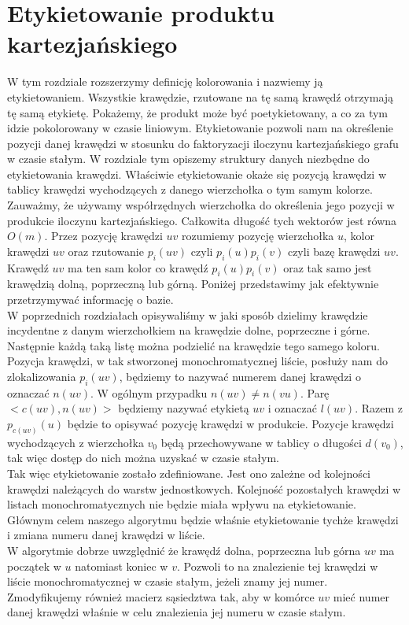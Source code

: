 \documentclass[12pt,a4paper,titlepage]{article}
\begin{document}
\section{Etykietowanie produktu kartezjańskiego}
W tym rozdziale rozszerzymy definicję kolorowania i nazwiemy ją etykietowaniem. Wszystkie krawędzie, rzutowane na tę samą krawędź otrzymają tę samą etykietę. Pokażemy, że produkt może być poetykietowany, a co za tym idzie pokolorowany w czasie liniowym. Etykietowanie pozwoli nam na określenie pozycji danej krawędzi w stosunku do faktoryzacji iloczynu kartezjańskiego grafu w czasie stałym. W rozdziale tym opiszemy struktury danych niezbędne do etykietowania krawędzi. Właściwie etykietowanie okaże się pozycją krawędzi w tablicy krawędzi wychodzących z danego wierzchołka o tym samym kolorze. \\
Zauważmy, że używamy współrzędnych wierzchołka do określenia jego pozycji w produkcie iloczynu kartezjańskiego. Całkowita długość tych wektorów jest równa $O(m)$. Przez pozycję krawędzi $uv$ rozumiemy pozycję wierzchołka $u$, kolor krawędzi $uv$ oraz rzutowanie $p_i (uv)$ czyli $p_i(u) p_i(v)$ czyli bazę krawędzi $uv$. \\
Krawędź $uv$ ma ten sam kolor co krawędź $p_i (u)p_i(v)$ oraz tak samo jest krawędzią dolną, poprzeczną lub górną. Poniżej przedstawimy jak efektywnie przetrzymywać informację o bazie. \\
W poprzednich rozdziałach opisywaliśmy w jaki sposób dzielimy krawędzie incydentne z danym wierzchołkiem na krawędzie dolne, poprzeczne i górne. Następnie każdą taką listę można podzielić na krawędzie tego samego koloru. Pozycja krawędzi, w tak stworzonej monochromatycznej liście, posłuży nam do zlokalizowania $p_i(uv)$, będziemy to nazywać numerem danej krawędzi o oznaczać $n(uv)$. W ogólnym przypadku $n(uv) \neq n(vu)$. Parę $<c(uv), n(uv)>$ będziemy nazywać etykietą $uv$ i oznaczać $l(uv)$. Razem z $p_{c(uv)}(u)$ będzie to opisywać pozycję krawędzi w produkcie. Pozycje krawędzi wychodzących z wierzchołka $v_0$ będą przechowywane w tablicy o długości $d(v_0)$, tak więc dostęp do nich można uzyskać w czasie stałym.\\
Tak więc etykietowanie zostało zdefiniowane. Jest ono zależne od kolejności krawędzi należących do warstw jednostkowych. Kolejność pozostałych krawędzi w listach monochromatycznych nie będzie miała wpływu na etykietowanie. Głównym celem naszego algorytmu będzie właśnie etykietowanie tychże krawędzi i zmiana numeru danej krawędzi w liście. \\
W algorytmie dobrze uwzględnić że krawędź dolna, poprzeczna lub górna $uv$ ma początek w $u$ natomiast koniec w $v$. Pozwoli to na znalezienie tej krawędzi w liście monochromatycznej w czasie stałym, jeżeli znamy jej numer. Zmodyfikujemy również macierz sąsiedztwa tak, aby w komórce $uv$ mieć numer danej krawędzi właśnie w celu znalezienia jej numeru w czasie stałym. \\
\end{document}

